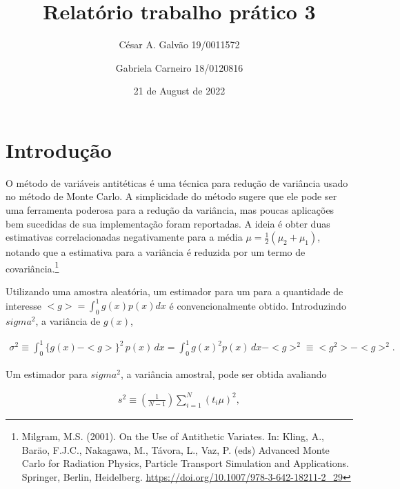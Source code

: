 \documentclass[
]{article}
\title{Relatório trabalho prático 3}
\author{César A. Galvão 19/0011572 \and Gabriela Carneiro 18/0120816}
\date{21 de August de 2022}
\begin{document}
\maketitle

\newpage{}

{
\setcounter{tocdepth}{3}
\tableofcontents
}
\let\oldsection\section
\renewcommand\section{\clearpage\oldsection}

\hypertarget{introduuxe7uxe3o}{%
\section{Introdução}\label{introduuxe7uxe3o}}

O método de variáveis antitéticas é uma técnica para redução de
variância usado no método de Monte Carlo. A simplicidade do método
sugere que ele pode ser uma ferramenta poderosa para a redução da
variância, mas poucas aplicações bem sucedidas de sua implementação
foram reportadas. A ideia é obter duas estimativas correlacionadas
negativamente para a média \(\mu = \frac{1}{2}(\mu_2 + \mu_1)\), notando
que a estimativa para a variância é reduzida por um termo de
covariância.\footnote{Milgram, M.S. (2001). On the Use of Antithetic
  Variates. In: Kling, A., Baräo, F.J.C., Nakagawa, M., Távora, L., Vaz,
  P. (eds) Advanced Monte Carlo for Radiation Physics, Particle
  Transport Simulation and Applications. Springer, Berlin, Heidelberg.
  \url{https://doi.org/10.1007/978-3-642-18211-2_29}}

Utilizando uma amostra aleatória, um estimador para um para a quantidade
de interesse \(<g> = \int^1_0g(x)p(x)dx\) é convencionalmente obtido.
Introduzindo \(sigma^2\), a variância de \(g(x)\),

\begin{align}
  \sigma^2 \equiv \int_0^1 \{ g(x) - <g>\}^2 \, p(x) \, dx = \int^1_0 g(x)^2 p(x) \, dx - <g>^2 \equiv <g^2> - <g>^2.
\end{align}

Um estimador para \(sigma^2\), a variância amostral, pode ser obtida
avaliando

\begin{align}
  s^2 \equiv \left( \frac{1}{N-1} \right) \sum\limits^N_{i=1}(t_i \mu)^2, 
\end{align}
\end{document}
